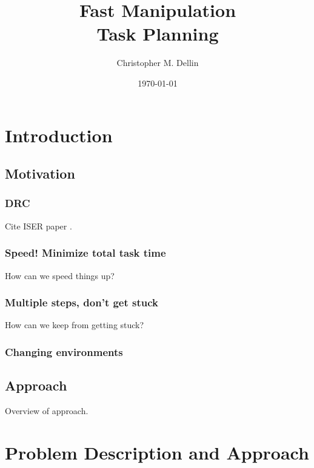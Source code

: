 \documentclass{report}
\title{Fast Manipulation\\Task Planning}
\author{Christopher M. Dellin}
\date{\today}
\begin{document}
\maketitle



\tableofcontents


\newpage
\chapter{Introduction}

\section{Motivation}

\subsection{DRC}

Cite ISER paper \cite{dellin2014drc}.

\subsection{Speed! Minimize total task time}

How can we speed things up?

\subsection{Multiple steps, don't get stuck}

How can we keep from getting stuck?

\subsection{Changing environments}

\section{Approach}

Overview of approach.


\newpage
\chapter{Problem Description and Approach}
\label{chap:formulation}
\end{document}
